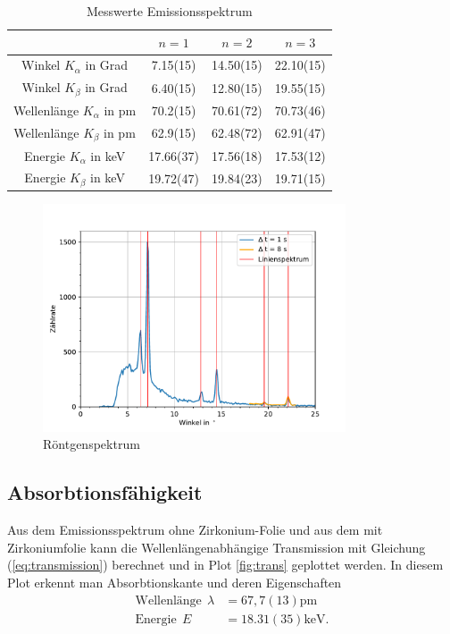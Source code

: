 \documentclass[11pt, a4paper]{article}
\begin{document}
    \begin{table}[h]
        \centering
        
        \begin{tabular}{c|c|c|c} \label{tab:roentgenspektrum}
        & \textbf{$n = 1$} & \textbf{$n = 2$} & \textbf{$n = 3$} \\ 
        \hline
        Winkel $K_{\alpha}$ in Grad & 7.15(15) & 14.50(15) & 22.10(15)\\ 
        Winkel $K_{\beta}$ in Grad & 6.40(15) & 12.80(15) & 19.55(15)\\ 
        Wellenlänge $K_{\alpha}$ in pm & 70.2(15) & 70.61(72) & 70.73(46) \\ 
        Wellenlänge $K_{\beta}$ in pm & 62.9(15) & 62.48(72) & 62.91(47)\\ 
        Energie $K_{\alpha}$ in keV & 17.66(37) & 17.56(18) & 17.53(12)\\ 
        Energie $K_{\beta}$ in keV & 19.72(47) & 19.84(23) & 19.71(15)\\ 
        \end{tabular}
        \caption{Messwerte Emissionsspektrum}
    \end{table}

    \begin{figure}
        \centering
        \includegraphics[width=0.8\textwidth]{NaCl-Spektrum.pdf}
        \caption{Röntgenspektrum}
        \label{fig:roentgenspektrum}
    \end{figure}

    \subsection{Absorbtionsfähigkeit}

    Aus dem Emissionsspektrum ohne Zirkonium-Folie und aus dem mit Zirkoniumfolie kann die Wellenlängenabhängige Transmission mit Gleichung (\ref{eq:transmission}) berechnet und in Plot \ref{fig:trans} geplottet werden. In diesem Plot erkennt man Absorbtionskante und deren Eigenschaften
    \begin{align}
        \text{Wellenlänge} \ \ \lambda &= 67,7(13) \si{\pico\meter}\\
        \text{Energie} \ \ E &= 18.31(35) \text{keV}.
    \end{align}
\end{document}
